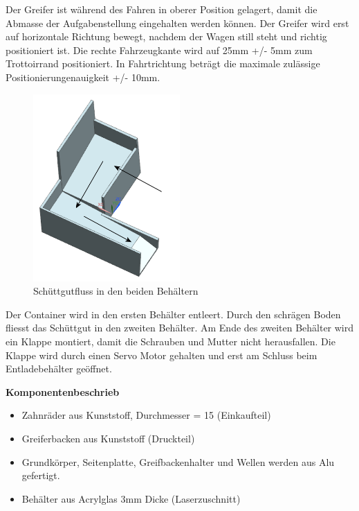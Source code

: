 Der Greifer ist während des Fahren in oberer Position gelagert, damit die Abmasse der Aufgabenstellung eingehalten werden können. Der Greifer wird erst auf horizontale Richtung bewegt, nachdem der Wagen still steht und richtig positioniert ist.
Die rechte Fahrzeugkante wird auf 25mm +/- 5mm zum Trottoirrand positioniert. In Fahrtrichtung beträgt die maximale zulässige Positionierungenauigkeit +/- 10mm.

\begin{figure}[H]
\centering
\includegraphics[width=0.5\textwidth]{03_Loesungskonzept/pictures/behaelter.png}
\caption{Schüttgutfluss in den beiden Behältern}
\end{figure}

Der Container wird in den ersten Behälter entleert. Durch den schrägen Boden fliesst das Schüttgut in den zweiten Behälter. Am Ende des zweiten Behälter wird ein Klappe montiert, damit die Schrauben und Mutter nicht herausfallen. Die Klappe wird durch einen Servo Motor gehalten und erst am Schluss beim Entladebehälter geöffnet.

\textbf{Komponentenbeschrieb}
\begin{itemize}
\item Zahnräder aus Kunststoff, Durchmesser = 15 (Einkaufteil)
\item Greiferbacken aus Kunststoff (Druckteil)
\item Grundkörper, Seitenplatte, Greifbackenhalter und Wellen werden aus Alu gefertigt.
\item Behälter aus Acrylglas 3mm Dicke (Laserzuschnitt)
\end{itemize}

